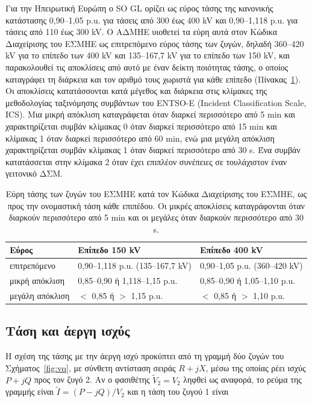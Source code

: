 Για την Ηπειρωτική Ευρώπη ο SO GL ορίζει ως εύρος τάσης της κανονικής κατάστασης
0,90--1,05 p.u. για τάσεις από 300 έως 400 kV και 0,90--1,118 p.u. για τάσεις από 110 έως
300 kV. Ο ΑΔΜΗΕ υιοθετεί τα εύρη αυτά στον Κώδικα Διαχείρισης του ΕΣΜΗΕ ως επιτρεπόμενο εύρος
τάσης των ζυγών, δηλαδή 360--420 kV για το επίπεδο των 400 kV και 135--167,7 kV για το
επίπεδο των 150 kV, και παρακολουθεί τις αποκλίσεις από αυτό με έναν δείκτη ποιότητας τάσης,
ο οποίος καταγράφει τη διάρκεια και τον αριθμό τους χωριστά για κάθε επίπεδο
(Πίνακας~\ref{tab:v-limits}). Οι αποκλίσεις κατατάσσονται κατά μέγεθος και διάρκεια στις
κλίμακες της μεθοδολογίας ταξινόμησης συμβάντων του ENTSO-E (Incident Classification Scale,
ICS). Μια μικρή απόκλιση καταγράφεται όταν διαρκεί περισσότερο από 5 min και χαρακτηρίζεται
συμβάν κλίμακας 0 όταν διαρκεί περισσότερο από 15 min και κλίμακας 1 όταν διαρκεί περισσότερο
από 60 min, ενώ μια μεγάλη απόκλιση χαρακτηρίζεται συμβάν κλίμακας 1 όταν διαρκεί περισσότερο
από 30 s. Ένα συμβάν κατατάσσεται στην κλίμακα 2 όταν έχει επιπλέον συνέπειες σε τουλάχιστον
έναν γειτονικό ΔΣΜ.

\begin{table}[!htbp]
\centering
\begin{tabular}{lll}
\hline
Εύρος & Επίπεδο 150 kV & Επίπεδο 400 kV \\
\hline
επιτρεπόμενο & 0,90--1,118 p.u. (135--167,7 kV) & 0,90--1,05 p.u. (360--420 kV) \\
μικρή απόκλιση & 0,85--0,90 ή 1,118--1,15 p.u. & 0,85--0,90 ή 1,05--1,10 p.u. \\
μεγάλη απόκλιση & $<$ 0,85 ή $>$ 1,15 p.u. & $<$ 0,85 ή $>$ 1,10 p.u. \\
\hline
\end{tabular}
\caption{Εύρη τάσης των ζυγών του ΕΣΜΗΕ κατά τον Κώδικα Διαχείρισης του ΕΣΜΗΕ, ως προς την
ονομαστική τάση κάθε επιπέδου. Οι μικρές αποκλίσεις καταγράφονται όταν διαρκούν περισσότερο
από 5 min και οι μεγάλες όταν διαρκούν περισσότερο από 30 s.}
\label{tab:v-limits}
\end{table}

\subsection{Τάση και άεργη ισχύς}
\label{sec:v-q}

Η σχέση της τάσης με την άεργη ισχύ προκύπτει από τη γραμμή δύο ζυγών του
Σχήματος~\ref{fig:vq}, με σύνθετη αντίσταση σειράς $R + jX$, μέσω της οποίας ρέει ισχύς
$P + jQ$ προς τον ζυγό 2. Αν ο φασιθέτης $\tilde{V}_2 = V_2$ ληφθεί ως αναφορά, το ρεύμα της
γραμμής είναι $\tilde{I} = (P - jQ)/V_2$ και η τάση του ζυγού 1 είναι

